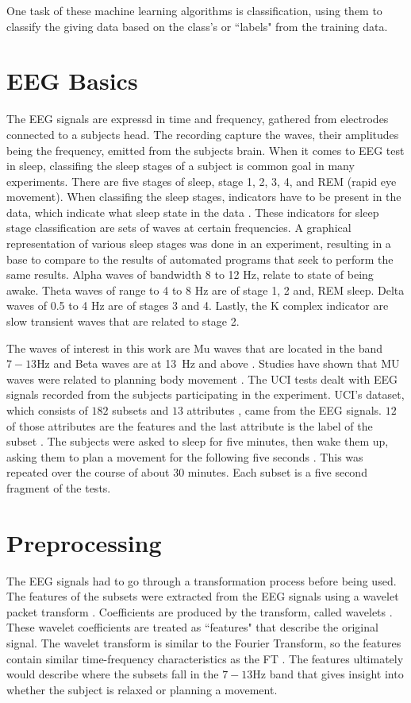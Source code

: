 \documentclass[conference,compsoc]{IEEEtran}
\begin{document}
One task of these machine learning algorithms is classification, using them to classify the giving data based on the class's or ``labels" from the training data. 

\section{EEG Basics}
The EEG signals are expressd in time and frequency, gathered from electrodes connected to a subjects head. The recording capture the waves, 
their amplitudes being the frequency, emitted from the subjects brain.  
When it comes to EEG test in sleep, classifing the sleep stages of a subject is common goal in many experiments.
There are five stages of sleep, stage 1, 2, 3, 4, and REM (rapid eye movement). When classifing the sleep stages, indicators 
have to be present in the data, which indicate what sleep state in the data \cite{auto}. These indicators for sleep stage classification
are sets of waves at certain frequencies. A graphical representation of various sleep stages was done in an experiment, resulting in a base 
to compare to the results of automated programs that seek to perform the same results. Alpha waves of bandwidth 8 to 12 Hz, relate to state 
of being awake. Theta waves of range to 4 to 8 Hz are of stage 1, 2 and, REM sleep.
Delta waves of 0.5 to 4 Hz are of stages 3 and 4. Lastly, the K complex indicator are slow transient waves that are related to stage 2.

The waves of interest in this work are Mu waves that are located in the band $7 - 13\si{\hertz}$ and Beta waves are at \SI{13}{\hertz} and above \cite{classsvm}. 
Studies have shown that MU waves were related to planning body movement \cite{classsvm}.
The UCI tests dealt with EEG signals recorded from the subjects participating in the experiment.  UCI's dataset, which consists of $182$ subsets and $13$ attributes \cite{classsvm}, 
came from the EEG signals. $12$ of those attributes are the features and the last attribute is the label of the subset \cite{online}. 
The subjects were asked to sleep for five minutes, then wake them up, asking them to plan a movement for the following five seconds \cite{classsvm}. This was repeated over 
the course of about 30 minutes. Each subset is a five second fragment of the tests.

\section{Preprocessing}
The EEG signals had to go through a transformation process before being used.
The features of the subsets were extracted from the EEG signals using a wavelet packet 
transform \cite{online}. Coefficients are produced by the transform, called wavelets \cite{wavelet}. These wavelet coefficients are treated as ``features" that describe the 
original signal. The wavelet transform is similar to the Fourier Transform, so the features contain similar time-frequency characteristics as the FT \cite{packet}. 
The features ultimately would describe where the subsets fall in the $7-13\si{\hertz}$ band that gives insight into whether the subject is relaxed or planning a movement.
\end{document}
